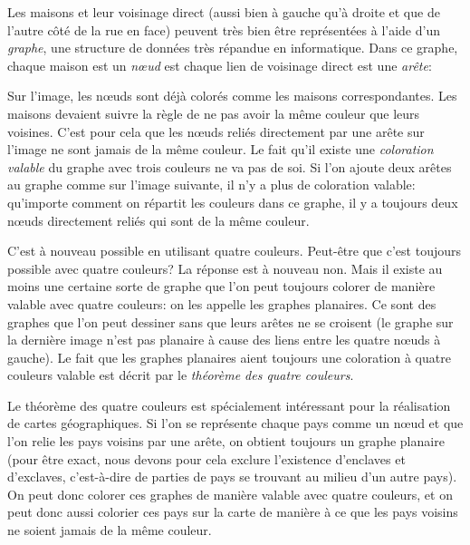 {{Les maisons et leur voisinage direct (aussi bien à gauche qu’à droite et que de l’autre côté de la rue en face) peuvent très bien être représentées à l’aide d’un \emph{graphe}, une structure de données très répandue en informatique. Dans ce graphe, chaque maison est un \emph{nœud} est chaque lien de voisinage direct est une \emph{arête}:

{\centering%
\par}

Sur l’image, les nœuds sont déjà colorés comme les maisons correspondantes. Les maisons devaient suivre la règle de ne pas avoir la même couleur que leurs voisines. C’est pour cela que les nœuds reliés directement par une arête sur l’image ne sont jamais de la même couleur. Le fait qu’il existe une \emph{coloration valable} du graphe avec trois couleurs ne va pas de soi. Si l’on ajoute deux arêtes au graphe comme sur l’image suivante, il n’y a plus de coloration valable: qu’importe comment on répartit les couleurs dans ce graphe, il y a toujours deux nœuds directement reliés qui sont de la même couleur.

{\centering%
\par}

C’est à nouveau possible en utilisant quatre couleurs. Peut-être que c’est toujours possible avec quatre couleurs? La réponse est à nouveau non. Mais il existe au moins une certaine sorte de graphe que l’on peut toujours colorer de manière valable avec quatre couleurs: on les appelle les graphes planaires. Ce sont des graphes que l’on peut dessiner sans que leurs arêtes ne se croisent (le graphe sur la dernière image n’est pas planaire à cause des liens entre les quatre nœuds à gauche). Le fait que les graphes planaires aient toujours une coloration à quatre couleurs valable est décrit par le \emph{théorème des quatre couleurs}.

Le théorème des quatre couleurs est spécialement intéressant pour la réalisation de cartes géographiques. Si l’on se représente chaque pays comme un nœud et que l’on relie les pays voisins par une arête, on obtient toujours un graphe planaire (pour être exact, nous devons pour cela exclure l’existence d’enclaves et d’exclaves, c’est-à-dire de parties de pays se trouvant au milieu d’un autre pays). On peut donc colorer ces graphes de manière valable avec quatre couleurs, et on peut donc aussi colorier ces pays sur la carte de manière à ce que les pays voisins ne soient jamais de la même couleur.

}}
